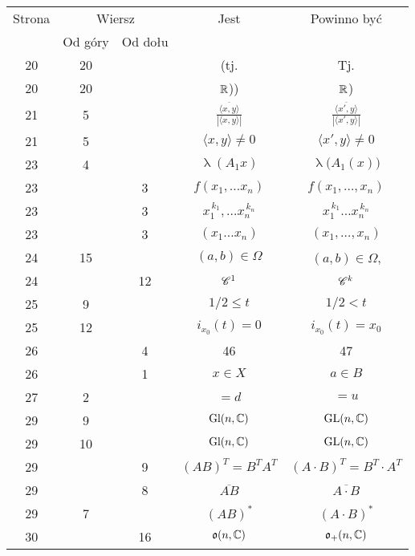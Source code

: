 \documentclass[a4paper,11pt]{article}
\numberwithin{equation}{section}
\renewcommand{\lambda}{\uplambda}
\begin{document}
\begin{center}
  \begin{tabular}{|c|c|c|c|c|}
    \hline
    Strona & \multicolumn{2}{c|}{Wiersz} & Jest
                              & Powinno być \\ \cline{2-3}
    & Od góry & Od dołu & & \\
    \hline
    20  & 20 & & (tj. & Tj. \\
    20  & 20 & & $\mathbb{R}$)) & $\mathbb{R}$) \\
    21  &  5 & & $\displaystyle
                 \frac{ \overline{ \langle x, y \rangle } }{ | \langle x, y \rangle | }$
    & $\displaystyle \frac{ \overline{ \langle x', y \rangle } }{ | \langle x', y \rangle | }$ \\
    21  &  5 & & $\langle x, y \rangle \neq 0$ & $\langle x', y \rangle \neq 0$ \\
    23  &  4 & & $\lambda ( A_{ 1 } x )$ & $\lambda \big( A_{ 1 }( x ) \big)$ \\
    23  & &  3 & $f( x_{ 1 }, \ldots x_{ n } )$ & $f( x_{ 1 }, \ldots, x_{ n } )$ \\
    23  & &  3 & $x_{ 1 }^{ \, k_{ 1 } }, \ldots x_{ n }^{ \, k_{ n } }$
           & $x_{ 1 }^{ \, k_{ 1 } } \ldots x_{ n }^{ \, k_{ n } }$ \\
    23  & &  3 & $( x_{ 1 } \ldots x_{ n } )$ & $( x_{ 1 }, \ldots, x_{ n } )$ \\
    24  & 15 & & $( a, b ) \in \Omega$ & $( a, b ) \in \Omega$, \\
    24  & & 12 & $\mathcal{C}^{ 1 }$ & $\mathcal{C}^{ k }$ \\
    25  &  9 & & $1 / 2 \leq t$ & $1 / 2 < t$ \\
    25  & 12 & & $i_{ x_{ 0 } }( t ) = 0$ & $i_{ x_{ 0 } }( t ) = x_{ 0 }$ \\
    26  & &  4 & 46 & 47 \\
    26  & &  1 & $x \in X$ & $a \in B$ \\
    27  &  2 & & $= d$ & $= u$ \\
    29  &  9 & & $\textrm{Gl}( n, \mathbb{C} )$ & $\mathrm{GL}( n, \mathbb{C} )$ \\
    29  & 10 & & $\textrm{Gl}( n, \mathbb{C} )$ & $\mathrm{GL}( n, \mathbb{C} )$ \\
    29  & &  9 & $( A B )^{ T } = B^{ T } A^{ T }$
           & $( A \cdot B )^{ T } = B^{ T } \cdot A^{ T }$ \\
    29  & &  8 & $\overline{ A B }$ & $\overline{ A \cdot B }$ \\
    29  &  7 & & $( A B )^{ * }$ & $( A \cdot B )^{ * }$ \\
    30  & & 16 & $\mathfrak{o}( n, \mathbb{C} )$ & $\mathfrak{o}_{ + }( n, \mathbb{C} )$ \\

\end{tabular}
\end{center}
\end{document}

